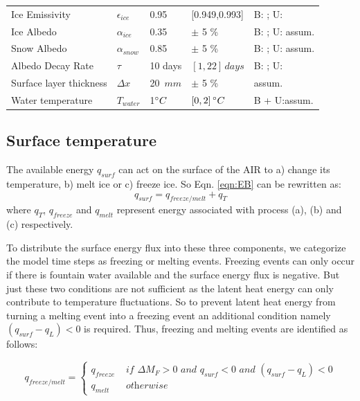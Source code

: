 \documentclass[utf8]{frontiersSCNS} %
\begin{document}
\begin{table}
\begin{tabularx}{\linewidth}{ X l X l X  }
        Ice Emissivity        & $\epsilon_{ice}$ & 0.95 & [0.949,0.993] & B: \citeauthor{CuffeyPaterson_2010}; U:
        \citeauthor{HORI2006486}\\
        Ice Albedo         & $\alpha_{ice}$ & 0.35 & $\pm$ 5 \%  & B: \citeauthor{CuffeyPaterson_2010}; U: assum.   \\
        Snow Albedo        & $\alpha_{snow}$ & 0.85 & $\pm$ 5 \% & B: \citeauthor{CuffeyPaterson_2010}; U: assum.  \\
        Albedo Decay Rate & $\tau$ & 10 days & $[1,22]\, days$ & B: \citeauthor{Schmidt_2017}; U:\citeauthor{OerlemansKnap_1998}  \\ 
        Surface layer thickness & $\Delta x$ & 20 $\,mm$ & $\pm$ 5 \%   & assum.\\
        Water temperature & $T_{water}$ & 1$\degree C$ & $[0,2]\, \degree C$   & B + U:assum. \\
        \hline 
    \end{tabularx} 
\end{table} 

\subsection{Surface temperature}
The available energy $q_{surf}$ can act on the surface of the AIR to a) change its temperature, b) melt ice or
c) freeze ice. So Eqn. \ref{eqn:EB} can be rewritten as: \begin{equation} q_{surf} = q_{freeze/melt} +
q_{T} \end{equation}
where $q_{T}$, $q_{freeze}$ and $q_{melt}$ represent energy associated with process (a), (b) and (c) respectively.

To distribute the surface energy flux into these three components, we categorize the model time steps as freezing or
melting events. Freezing events can only occur if there is fountain water available and the surface energy flux is
negative. But just these two conditions are not sufficient as the latent heat energy can only contribute to temperature
fluctuations. So to prevent latent heat energy from turning a melting event into a freezing event an additional
condition namely $(q_{surf}-q_{L}) < 0$ is required. Thus, freezing and melting events are identified as follows:

\begin{equation} 
    q_{freeze/melt} = \left\{ \begin{array}{ll}
            q_{freeze} & \textit{ if } \Delta M_{F} > 0 \textit{ and } q_{surf} < 0 \textit{ and }(q_{surf}-q_{L}) < 0 \\
            q_{melt} & \textit{ otherwise} 
    \end{array} \right. 
\end{equation} 
\end{document}
